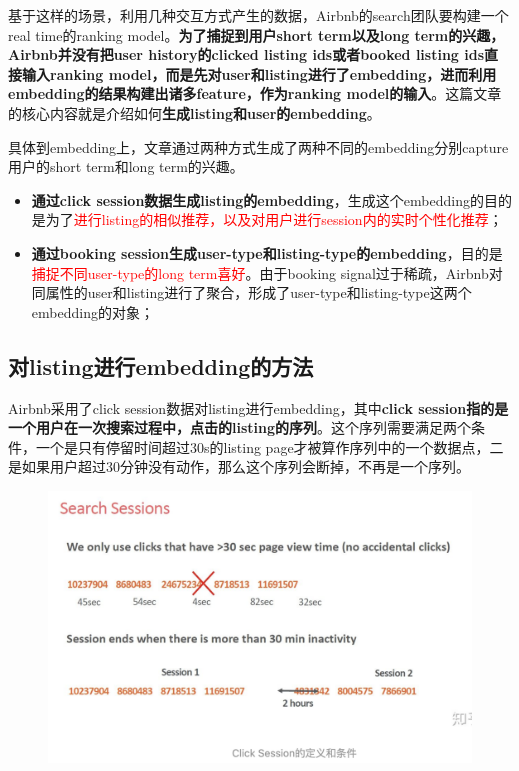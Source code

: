 \documentclass[12pt]{article}
\begin{document}
基于这样的场景，利用几种交互方式产生的数据，Airbnb的search团队要构建一个real time的ranking model。\textbf{为了捕捉到用户short term以及long term的兴趣，Airbnb并没有把user history的clicked listing ids或者booked listing ids直接输入ranking model，而是先对user和listing进行了embedding，进而利用embedding的结果构建出诸多feature，作为ranking model的输入}。这篇文章的核心内容就是介绍如何\textbf{生成listing和user的embedding}。

具体到embedding上，文章通过两种方式生成了两种不同的embedding分别capture用户的short term和long term的兴趣。
\begin{itemize}
\setlength{\itemsep}{0pt}
\setlength{\parsep}{0pt}
\setlength{\parskip}{0pt}
    \item \textbf{通过click session数据生成listing的embedding}，生成这个embedding的目的是为了\textcolor{red}{进行listing的相似推荐，以及对用户进行session内的实时个性化推荐}；
    \item \textbf{通过booking session生成user-type和listing-type的embedding}，目的是\textcolor{red}{捕捉不同user-type的long term喜好}。由于booking signal过于稀疏，Airbnb对同属性的user和listing进行了聚合，形成了user-type和listing-type这两个embedding的对象；
\end{itemize}

\subsection{对listing进行embedding的方法}
Airbnb采用了click session数据对listing进行embedding，其中\textbf{click session指的是一个用户在一次搜索过程中，点击的listing的序列}。这个序列需要满足两个条件，一个是只有停留时间超过30s的listing page才被算作序列中的一个数据点，二是如果用户超过30分钟没有动作，那么这个序列会断掉，不再是一个序列。

\begin{figure}[H]
    \centering
    \includegraphics[width=1\textwidth]{fig/Airbnb_Click_Sessions.png}
\end{figure}
\end{document}

